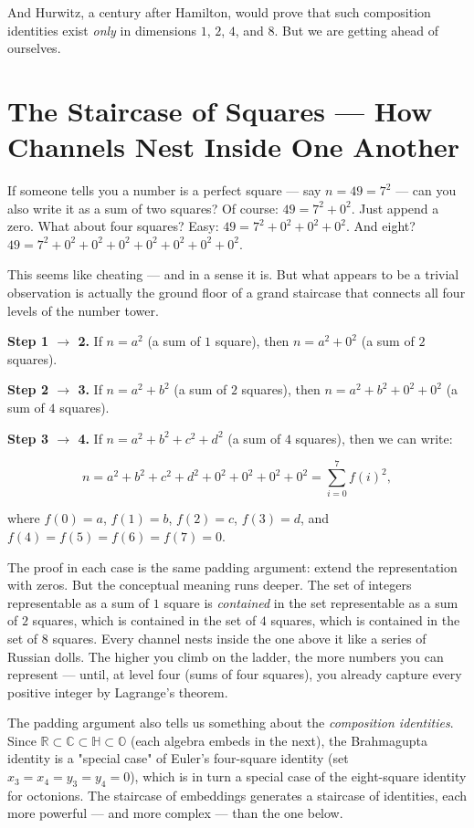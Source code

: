 \documentclass[11pt,twoside,openright]{book}
\theoremstyle{definition}
\theoremstyle{remark}
\begin{document}
And Hurwitz, a century after Hamilton, would prove that such composition identities exist \textit{only} in dimensions $1$, $2$, $4$, and $8$. But we are getting ahead of ourselves.


\section{The Staircase of Squares --- How Channels Nest Inside One Another}

If someone tells you a number is a perfect square --- say $n = 49 = 7^2$ --- can you also write it as a sum of two squares? Of course: $49 = 7^2 + 0^2$. Just append a zero. What about four squares? Easy: $49 = 7^2 + 0^2 + 0^2 + 0^2$. And eight? $49 = 7^2 + 0^2 + 0^2 + 0^2 + 0^2 + 0^2 + 0^2 + 0^2$.

This seems like cheating --- and in a sense it is. But what appears to be a trivial observation is actually the ground floor of a grand staircase that connects all four levels of the number tower.

\textbf{Step 1 $\to$ 2.} If $n = a^2$ (a sum of $1$ square), then $n = a^2 + 0^2$ (a sum of $2$ squares).

\textbf{Step 2 $\to$ 3.} If $n = a^2 + b^2$ (a sum of $2$ squares), then $n = a^2 + b^2 + 0^2 + 0^2$ (a sum of $4$ squares).

\textbf{Step 3 $\to$ 4.} If $n = a^2 + b^2 + c^2 + d^2$ (a sum of $4$ squares), then we can write:

\[n = a^2 + b^2 + c^2 + d^2 + 0^2 + 0^2 + 0^2 + 0^2 = \sum_{i=0}^{7} f(i)^2,\]

where $f(0) = a$, $f(1) = b$, $f(2) = c$, $f(3) = d$, and $f(4) = f(5) = f(6) = f(7) = 0$.


The proof in each case is the same padding argument: extend the representation with zeros. But the conceptual meaning runs deeper. The set of integers representable as a sum of $1$ square is \textit{contained} in the set representable as a sum of $2$ squares, which is contained in the set of $4$ squares, which is contained in the set of $8$ squares. Every channel nests inside the one above it like a series of Russian dolls. The higher you climb on the ladder, the more numbers you can represent --- until, at level four (sums of four squares), you already capture every positive integer by Lagrange's theorem.

The padding argument also tells us something about the \textit{composition identities}. Since $\mathbb{R} \subset \mathbb{C} \subset \mathbb{H} \subset \mathbb{O}$ (each algebra embeds in the next), the Brahmagupta identity is a "special case" of Euler's four-square identity (set $x_3 = x_4 = y_3 = y_4 = 0$), which is in turn a special case of the eight-square identity for octonions. The staircase of embeddings generates a staircase of identities, each more powerful --- and more complex --- than the one below.
\end{document}
